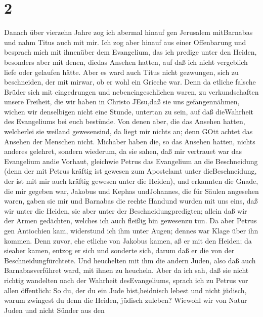 \hypertarget{section}{%
\section{2}\label{section}}

 Danach über vierzehn Jahre zog ich abermal hinauf gen
Jerusalem mitBarnabas und nahm Titus auch mit mir.  Ich zog
aber hinauf aus einer Offenbarung und besprach mich mit ihnenüber dem
Evangelium, das ich predige unter den Heiden, besonders aber mit denen,
diedas Ansehen hatten, auf daß ich nicht vergeblich liefe oder gelaufen
hätte.  Aber es ward auch Titus nicht gezwungen, sich zu
beschneiden, der mit mirwar, ob er wohl ein Grieche war. 
Denn da etliche falsche Brüder sich mit eingedrungen und
nebeneingeschlichen waren, zu verkundschaften unsere Freiheit, die wir
haben in Christo JEsu,daß sie uns gefangennähmen,  wichen
wir denselbigen nicht eine Stunde, untertan zu sein, auf daß dieWahrheit
des Evangeliums bei euch bestünde.  Von denen aber, die das
Ansehen hatten, welcherlei sie weiland gewesensind, da liegt mir nichts
an; denn GOtt achtet das Ansehen der Menschen nicht. Michaber haben die,
so das Ansehen hatten, nichts anderes gelehret,  sondern
wiederum, da sie sahen, daß mir vertrauet war das Evangelium andie
Vorhaut, gleichwie Petrus das Evangelium an die Beschneidung
 (denn der mit Petrus kräftig ist gewesen zum Apostelamt
unter dieBeschneidung, der ist mit mir auch kräftig gewesen unter die
Heiden),  und erkannten die Gnade, die mir gegeben war,
Jakobus und Kephas undJohannes, die für Säulen angesehen waren, gaben
sie mir und Barnabas die rechte Handund wurden mit uns eins, daß wir
unter die Heiden, sie aber unter der Beschneidungpredigten;
 allein daß wir der Armen gedächten, welches ich auch
fleißig bin gewesenzu tun.  Da aber Petrus gen Antiochien
kam, widerstund ich ihm unter Augen; dennes war Klage über ihn kommen.
 Denn zuvor, ehe etliche von Jakobus kamen, aß er mit den
Heiden; da sieaber kamen, entzog er sich und sonderte sich, darum daß er
die von der Beschneidungfürchtete.  Und heuchelten mit ihm
die andern Juden, also daß auch Barnabasverführet ward, mit ihnen zu
heucheln.  Aber da ich sah, daß sie nicht richtig wandelten
nach der Wahrheit desEvangeliums, sprach ich zu Petrus vor allen
öffentlich: So du, der du ein Jude bist,heidnisch lebest und nicht
jüdisch, warum zwingest du denn die Heiden, jüdisch zuleben?
 Wiewohl wir von Natur Juden und nicht Sünder aus den
